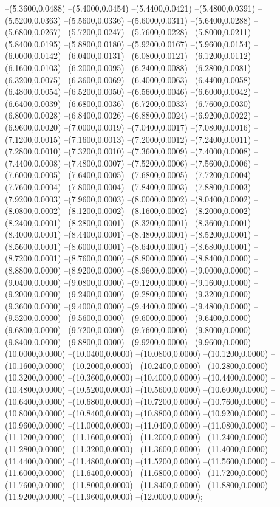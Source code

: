 {	--(5.3600,0.0488)
	--(5.4000,0.0454)
	--(5.4400,0.0421)
	--(5.4800,0.0391)
	--(5.5200,0.0363)
	--(5.5600,0.0336)
	--(5.6000,0.0311)
	--(5.6400,0.0288)
	--(5.6800,0.0267)
	--(5.7200,0.0247)
	--(5.7600,0.0228)
	--(5.8000,0.0211)
	--(5.8400,0.0195)
	--(5.8800,0.0180)
	--(5.9200,0.0167)
	--(5.9600,0.0154)
	--(6.0000,0.0142)
	--(6.0400,0.0131)
	--(6.0800,0.0121)
	--(6.1200,0.0112)
	--(6.1600,0.0103)
	--(6.2000,0.0095)
	--(6.2400,0.0088)
	--(6.2800,0.0081)
	--(6.3200,0.0075)
	--(6.3600,0.0069)
	--(6.4000,0.0063)
	--(6.4400,0.0058)
	--(6.4800,0.0054)
	--(6.5200,0.0050)
	--(6.5600,0.0046)
	--(6.6000,0.0042)
	--(6.6400,0.0039)
	--(6.6800,0.0036)
	--(6.7200,0.0033)
	--(6.7600,0.0030)
	--(6.8000,0.0028)
	--(6.8400,0.0026)
	--(6.8800,0.0024)
	--(6.9200,0.0022)
	--(6.9600,0.0020)
	--(7.0000,0.0019)
	--(7.0400,0.0017)
	--(7.0800,0.0016)
	--(7.1200,0.0015)
	--(7.1600,0.0013)
	--(7.2000,0.0012)
	--(7.2400,0.0011)
	--(7.2800,0.0010)
	--(7.3200,0.0010)
	--(7.3600,0.0009)
	--(7.4000,0.0008)
	--(7.4400,0.0008)
	--(7.4800,0.0007)
	--(7.5200,0.0006)
	--(7.5600,0.0006)
	--(7.6000,0.0005)
	--(7.6400,0.0005)
	--(7.6800,0.0005)
	--(7.7200,0.0004)
	--(7.7600,0.0004)
	--(7.8000,0.0004)
	--(7.8400,0.0003)
	--(7.8800,0.0003)
	--(7.9200,0.0003)
	--(7.9600,0.0003)
	--(8.0000,0.0002)
	--(8.0400,0.0002)
	--(8.0800,0.0002)
	--(8.1200,0.0002)
	--(8.1600,0.0002)
	--(8.2000,0.0002)
	--(8.2400,0.0001)
	--(8.2800,0.0001)
	--(8.3200,0.0001)
	--(8.3600,0.0001)
	--(8.4000,0.0001)
	--(8.4400,0.0001)
	--(8.4800,0.0001)
	--(8.5200,0.0001)
	--(8.5600,0.0001)
	--(8.6000,0.0001)
	--(8.6400,0.0001)
	--(8.6800,0.0001)
	--(8.7200,0.0001)
	--(8.7600,0.0000)
	--(8.8000,0.0000)
	--(8.8400,0.0000)
	--(8.8800,0.0000)
	--(8.9200,0.0000)
	--(8.9600,0.0000)
	--(9.0000,0.0000)
	--(9.0400,0.0000)
	--(9.0800,0.0000)
	--(9.1200,0.0000)
	--(9.1600,0.0000)
	--(9.2000,0.0000)
	--(9.2400,0.0000)
	--(9.2800,0.0000)
	--(9.3200,0.0000)
	--(9.3600,0.0000)
	--(9.4000,0.0000)
	--(9.4400,0.0000)
	--(9.4800,0.0000)
	--(9.5200,0.0000)
	--(9.5600,0.0000)
	--(9.6000,0.0000)
	--(9.6400,0.0000)
	--(9.6800,0.0000)
	--(9.7200,0.0000)
	--(9.7600,0.0000)
	--(9.8000,0.0000)
	--(9.8400,0.0000)
	--(9.8800,0.0000)
	--(9.9200,0.0000)
	--(9.9600,0.0000)
	--(10.0000,0.0000)
	--(10.0400,0.0000)
	--(10.0800,0.0000)
	--(10.1200,0.0000)
	--(10.1600,0.0000)
	--(10.2000,0.0000)
	--(10.2400,0.0000)
	--(10.2800,0.0000)
	--(10.3200,0.0000)
	--(10.3600,0.0000)
	--(10.4000,0.0000)
	--(10.4400,0.0000)
	--(10.4800,0.0000)
	--(10.5200,0.0000)
	--(10.5600,0.0000)
	--(10.6000,0.0000)
	--(10.6400,0.0000)
	--(10.6800,0.0000)
	--(10.7200,0.0000)
	--(10.7600,0.0000)
	--(10.8000,0.0000)
	--(10.8400,0.0000)
	--(10.8800,0.0000)
	--(10.9200,0.0000)
	--(10.9600,0.0000)
	--(11.0000,0.0000)
	--(11.0400,0.0000)
	--(11.0800,0.0000)
	--(11.1200,0.0000)
	--(11.1600,0.0000)
	--(11.2000,0.0000)
	--(11.2400,0.0000)
	--(11.2800,0.0000)
	--(11.3200,0.0000)
	--(11.3600,0.0000)
	--(11.4000,0.0000)
	--(11.4400,0.0000)
	--(11.4800,0.0000)
	--(11.5200,0.0000)
	--(11.5600,0.0000)
	--(11.6000,0.0000)
	--(11.6400,0.0000)
	--(11.6800,0.0000)
	--(11.7200,0.0000)
	--(11.7600,0.0000)
	--(11.8000,0.0000)
	--(11.8400,0.0000)
	--(11.8800,0.0000)
	--(11.9200,0.0000)
	--(11.9600,0.0000)
	--(12.0000,0.0000);
}
